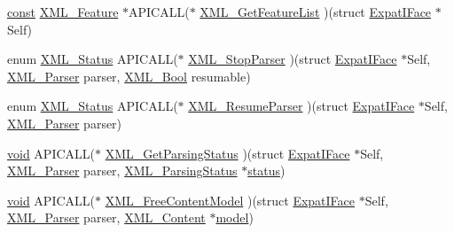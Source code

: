 \begin{DoxyCompactItemize}
\item 
\hyperlink{getopt1_8c_a2c212835823e3c54a8ab6d95c652660e}{const} \hyperlink{struct_x_m_l___feature}{X\+M\+L\+\_\+\+Feature} $\ast$A\+P\+I\+C\+A\+LL($\ast$ \hyperlink{struct_expat_i_face_a2a8a5223c12b27e14eb4186b9aec923c}{X\+M\+L\+\_\+\+Get\+Feature\+List} )(struct \hyperlink{struct_expat_i_face}{Expat\+I\+Face} $\ast$Self)
\item 
enum \hyperlink{amiga_2include_2libraries_2expat_8h_aef71ca3ac8198499d56aaa7b474303bb}{X\+M\+L\+\_\+\+Status} A\+P\+I\+C\+A\+LL($\ast$ \hyperlink{struct_expat_i_face_ae45b7afcd50f3d99af64b533ce171bd8}{X\+M\+L\+\_\+\+Stop\+Parser} )(struct \hyperlink{struct_expat_i_face}{Expat\+I\+Face} $\ast$Self, \hyperlink{amiga_2include_2libraries_2expat_8h_a9dc0003156857c67b3a60b3993846013}{X\+M\+L\+\_\+\+Parser} parser, \hyperlink{amiga_2include_2libraries_2expat_8h_a5fe41bca8b7a23b2405f1b967e70f33a}{X\+M\+L\+\_\+\+Bool} resumable)
\item 
enum \hyperlink{amiga_2include_2libraries_2expat_8h_aef71ca3ac8198499d56aaa7b474303bb}{X\+M\+L\+\_\+\+Status} A\+P\+I\+C\+A\+LL($\ast$ \hyperlink{struct_expat_i_face_a86d361b13c90b60b547f1598a5a0bb1a}{X\+M\+L\+\_\+\+Resume\+Parser} )(struct \hyperlink{struct_expat_i_face}{Expat\+I\+Face} $\ast$Self, \hyperlink{amiga_2include_2libraries_2expat_8h_a9dc0003156857c67b3a60b3993846013}{X\+M\+L\+\_\+\+Parser} parser)
\item 
\hyperlink{sound_8c_ae35f5844602719cf66324f4de2a658b3}{void} A\+P\+I\+C\+A\+LL($\ast$ \hyperlink{struct_expat_i_face_a080255406738979aca3b9548f6c2966c}{X\+M\+L\+\_\+\+Get\+Parsing\+Status} )(struct \hyperlink{struct_expat_i_face}{Expat\+I\+Face} $\ast$Self, \hyperlink{amiga_2include_2libraries_2expat_8h_a9dc0003156857c67b3a60b3993846013}{X\+M\+L\+\_\+\+Parser} parser, \hyperlink{struct_x_m_l___parsing_status}{X\+M\+L\+\_\+\+Parsing\+Status} $\ast$\hyperlink{rfft2d_test_m_l_8m_a1b5437a866e6f95107b07ba845bc1800}{status})
\item 
\hyperlink{sound_8c_ae35f5844602719cf66324f4de2a658b3}{void} A\+P\+I\+C\+A\+LL($\ast$ \hyperlink{struct_expat_i_face_a17d98dcd251d66f8b7ed89256780afc0}{X\+M\+L\+\_\+\+Free\+Content\+Model} )(struct \hyperlink{struct_expat_i_face}{Expat\+I\+Face} $\ast$Self, \hyperlink{amiga_2include_2libraries_2expat_8h_a9dc0003156857c67b3a60b3993846013}{X\+M\+L\+\_\+\+Parser} parser, \hyperlink{amiga_2include_2libraries_2expat_8h_a791d9e7de669ec5395df17978e1c507e}{X\+M\+L\+\_\+\+Content} $\ast$\hyperlink{lib_2expat_8h_ac517f0c27408fbd365e7dd34e032faca}{model})
\item 

\end{DoxyCompactItemize}
